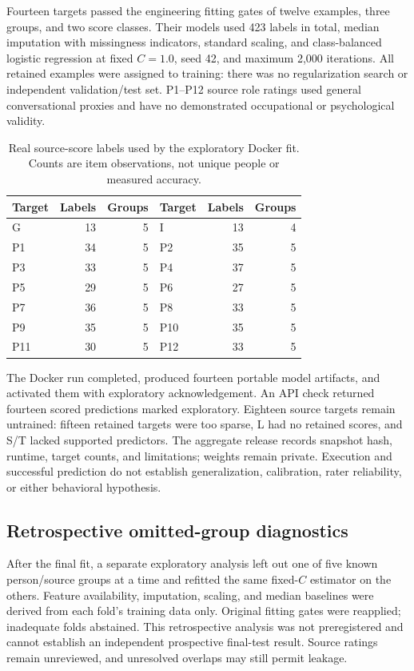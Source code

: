 \documentclass{article}
\begin{document}
Fourteen targets passed the engineering fitting gates of twelve examples, three groups, and two score classes. Their models used 423 labels in total, median imputation with missingness indicators, standard scaling, and class-balanced logistic regression at fixed $C=1.0$, seed 42, and maximum 2,000 iterations. All retained examples were assigned to training: there was no regularization search or independent validation/test set. P1--P12 source role ratings used general conversational proxies and have no demonstrated occupational or psychological validity.

\begin{table}[ht]
\centering\small
\caption{Real source-score labels used by the exploratory Docker fit. Counts are item observations, not unique people or measured accuracy.}
\begin{tabular}{lrr@{\qquad}lrr}
\toprule
Target & Labels & Groups & Target & Labels & Groups \\
\midrule
G & 13 & 5 & I & 13 & 4 \\
P1 & 34 & 5 & P2 & 35 & 5 \\
P3 & 33 & 5 & P4 & 37 & 5 \\
P5 & 29 & 5 & P6 & 27 & 5 \\
P7 & 36 & 5 & P8 & 33 & 5 \\
P9 & 35 & 5 & P10 & 35 & 5 \\
P11 & 30 & 5 & P12 & 33 & 5 \\
\bottomrule
\end{tabular}
\end{table}

The Docker run completed, produced fourteen portable model artifacts, and activated them with exploratory acknowledgement. An API check returned fourteen scored predictions marked exploratory. Eighteen source targets remain untrained: fifteen retained targets were too sparse, L had no retained scores, and S/T lacked supported predictors. The aggregate release records snapshot hash, runtime, target counts, and limitations; weights remain private. Execution and successful prediction do not establish generalization, calibration, rater reliability, or either behavioral hypothesis.

\subsection{Retrospective omitted-group diagnostics}
After the final fit, a separate exploratory analysis left out one of five known person/source groups at a time and refitted the same fixed-$C$ estimator on the others. Feature availability, imputation, scaling, and median baselines were derived from each fold's training data only. Original fitting gates were reapplied; inadequate folds abstained. This retrospective analysis was not preregistered and cannot establish an independent prospective final-test result. Source ratings remain unreviewed, and unresolved overlaps may still permit leakage.
\end{document}
